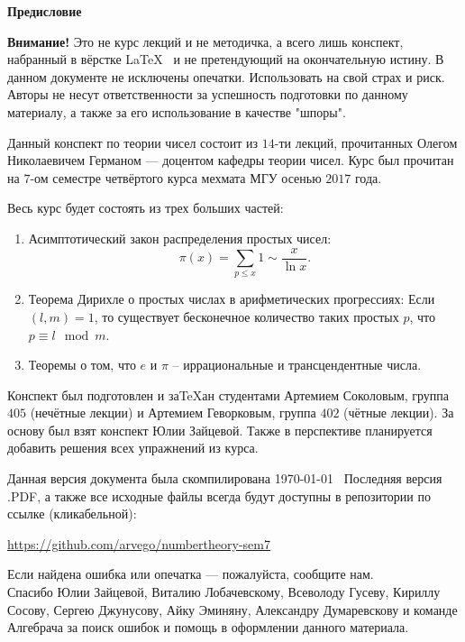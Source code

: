 \begin{center}
	\Large \bf{Предисловие}~\\
\end{center}

\tab \textbf{Внимание!} Это не курс лекций и не методичка, а всего лишь конспект, набранный в вёрстке \LaTeX~ и не претендующий на окончательную истину. В данном документе не исключены опечатки. Использовать на свой страх и риск. Авторы не несут ответственности за успешность подготовки по данному материалу, а также за его использование в качестве "шпоры".

\tab Данный конспект по теории чисел состоит из $14$-ти лекций, прочитанных Олегом Николаевичем Германом --- доцентом кафедры теории чисел. Курс был прочитан на $7$-ом семестре четвёртого курса мехмата МГУ осенью $2017$ года.

\tab Весь курс будет состоять из трех больших частей:
\begin{enumerate}
 	\item Асимптотический закон распределения простых чисел: 
			$$\pi(x) = \sum_{p \leq x} 1 \sim \frac{x}{\ln x}.$$
	\item Теорема Дирихле о простых числах в арифметических прогрессиях:
			Если $(l, m) = 1$, то существует бесконечное количество таких простых $p$, что $p \equiv l \mod m$.
	\item Теоремы о том, что  $e$ и $\pi$ -- иррациональные и трансцендентные числа.
\end{enumerate}

\tab Конспект был подготовлен и за\TeX ан студентами Артемием Соколовым, группа $405$ (нечётные лекции) и Артемием Геворковым, группа $402$ (чётные лекции). За основу был взят конспект Юлии Зайцевой. Также в перспективе планируется добавить решения всех упражнений из курса.

\tab Данная версия документа была скомпилирована \today~ Последняя версия .PDF, а также все исходные файлы всегда будут доступны в репозитории по ссылке (кликабельной):
\begin{center}
\href{https://github.com/arvego/numbertheory-sem7}{https://github.com/arvego/numbertheory-sem7}
\end{center}
Если найдена ошибка или опечатка --- пожалуйста, сообщите нам.\\



\tab Спасибо Юлии Зайцевой, Виталию Лобачевскому, Всеволоду Гусеву, Кириллу Сосову, Сергею Джунусову, Айку Эминяну, Александру Думаревскову и команде Алгебрача за поиск ошибок и помощь в оформлении данного материала.